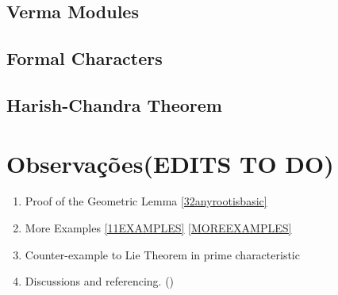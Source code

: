 \documentclass[svgnames,12pt,oneside, openright,a4paper]{scrbook}
\begin{document}
\section{Verma Modules}
\section{Formal Characters}
\section{Harish-Chandra Theorem}
\chapter{Observações(EDITS TO DO)}
\begin{enumerate}
	\item Proof of the Geometric Lemma \ref{32anyrootisbasic}
	\item More Examples \ref{11EXAMPLES} \ref{MOREEXAMPLES} 
	\item Counter-example to Lie Theorem in prime characteristic
	\item Discussions and referencing.
	(\cite{jacobson}\cite{humphreys2}\cite{sanmartin})
\end{enumerate}


\end{document}
